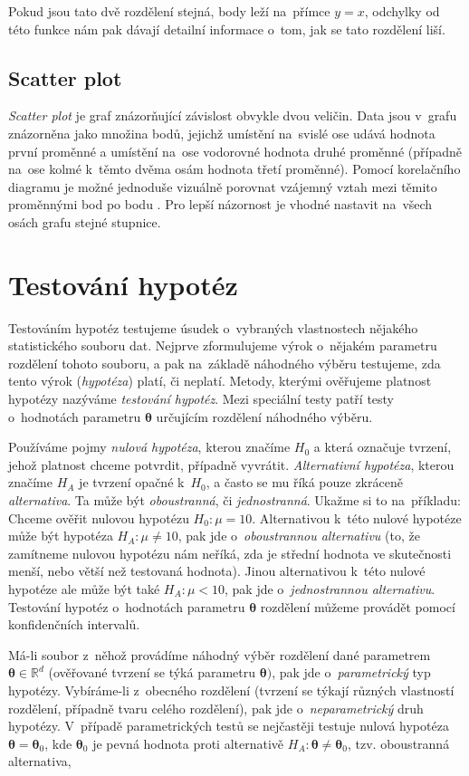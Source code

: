 \documentclass[thesis=B,czech]{FITthesis}[2012/06/26]
\begin{document}
Pokud jsou tato dvě rozdělení stejná, body leží na~přímce $y=x$, odchylky od této funkce nám pak dávají detailní informace o~tom, jak se tato rozdělení liší. 

\subsection{Scatter plot}
\textit{Scatter plot} je graf znázorňující závislost obvykle dvou veličin. Data jsou v~grafu znázorněna jako množina bodů, jejichž umístění na~svislé ose udává hodnota první proměnné a umístění na~ose vodorovné hodnota druhé proměnné (případně na~ose kolmé k~těmto dvěma osám hodnota třetí proměnné). Pomocí korelačního diagramu je možné jednoduše vizuálně porovnat vzájemný vztah mezi těmito proměnnými bod po bodu \cite[p.82-87]{GraphMethods}. Pro lepší názornost je vhodné nastavit na~všech osách grafu stejné stupnice.


\section{Testování hypotéz}
Testováním hypotéz testujeme úsudek o~vybraných vlastnostech nějakého statistického souboru dat. Nejprve zformulujeme výrok o~nějakém parametru rozdělení tohoto souboru, a pak na~základě náhodného výběru testujeme, zda tento výrok (\textit{hypotéza}) platí, či neplatí. Metody, kterými ověřujeme platnost hypotézy nazýváme \textit{testování hypotéz}. Mezi speciální testy patří testy o~hodnotách parametru $\boldsymbol{\theta}$ určujícím rozdělení náhodného výběru. 

Používáme pojmy \textit{nulová hypotéza}, kterou značíme $H_{0}$ a která označuje tvrzení, jehož platnost chceme potvrdit, případně vyvrátit. \textit{Alternativní hypotéza}, kterou značíme $H_{A}$ je tvrzení opačné k~$H_0$, a často se mu říká pouze zkráceně \textit{alternativa}. Ta může být \textit{oboustranná}, či \textit{jednostranná}. Ukažme si to na~příkladu:
Chceme ověřit nulovou hypotézu $H_{0}: \mu = 10$. Alternativou k~této nulové hypotéze může být hypotéza $H_{A}: \mu\neq10$, pak jde o~\textit{oboustrannou alternativu} (to, že zamítneme nulovou hypotézu nám neříká, zda je střední hodnota ve skutečnosti menší, nebo větší než testovaná hodnota). Jinou alternativou k~této nulové hypotéze ale může být také $H_{A}:\mu<10$, pak jde o~\textit{jednostrannou alternativu}. Testování hypotéz o~hodnotách parametru $\boldsymbol{\theta}$ rozdělení můžeme provádět pomocí konfidenčních intervalů.

Má-li soubor z~něhož provádíme náhodný výběr rozdělení dané parametrem $\boldsymbol{\theta}\in\mathbb{R}^{d}$ (ověřované tvrzení se týká parametru $\boldsymbol{\theta})$, pak jde o~\textit{parametrický} typ hypotézy. Vybíráme-li z~obecného rozdělení (tvrzení se týkají různých vlastností rozdělení, případně tvaru celého rozdělení), pak jde o~\textit{neparametrický} druh hypotézy. V~případě parametrických testů se nejčastěji testuje nulová hypotéza $\boldsymbol{\theta} = \boldsymbol{\theta}_0$, kde $\boldsymbol{\theta}_0$ je pevná hodnota proti alternativě $H_A: \boldsymbol{\theta} \neq \boldsymbol{\theta}_0$, tzv. oboustranná alternativa, 
\end{document}
